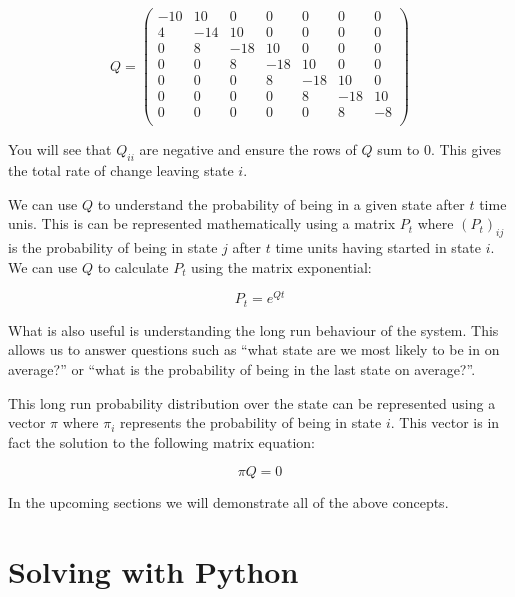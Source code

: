 \begin{equation}
Q =
\begin{pmatrix}
-10 &  10 &   0 &   0 &   0 &   0 &   0\\
  4 & -14 &  10 &   0 &   0 &   0 &   0\\
  0 &   8 & -18 &  10 &   0 &   0 &   0\\
  0 &   0 &   8 & -18 &  10 &   0 &   0\\
  0 &   0 &   0 &   8 & -18 &  10 &   0\\
  0 &   0 &   0 &   0 &   8 & -18 &  10\\
  0 &   0 &   0 &   0 &   0 &   8 &  -8\\
 \end{pmatrix}
 \label{eqn:barber_shop_transition_matrix}
\end{equation}

You will see that \(Q_{ii}\) are negative and ensure the rows of \(Q\) sum to 0.
This gives the total rate of change leaving state \(i\).

We can use \(Q\) to understand the probability of being in a given state after
\(t\) time unis. This is can be represented mathematically using a matrix
\(P_{t}\) where \((P_{t})_{ij}\) is the probability of being in state \(j\)
after \(t\) time units having started in state \(i\). We can use \(Q\) to
calculate \(P_{t}\) using the matrix exponential:

\begin{equation}
    P_t = e^{Qt}
    \label{eqn:continuous_time_markov_process_matrix_exponential}
\end{equation}

What is also useful is understanding the long run behaviour of the
system. This allows us to answer questions such as ``what state are we most
likely to be in on average?'' or ``what is the probability of being in the last
state on average?''.

This long run probability distribution over the state can be represented using a
vector \(\pi\) where \(\pi_i\) represents the probability of being in state
\(i\). This vector is in fact the solution to the following matrix equation:

\begin{equation}
    \pi Q = 0
    \label{eqn:continuous_time_markov_process_steady_state}
\end{equation}

In the upcoming sections we will demonstrate all of the above concepts.

\section{Solving with Python}\label{sec:solving-with-python}

